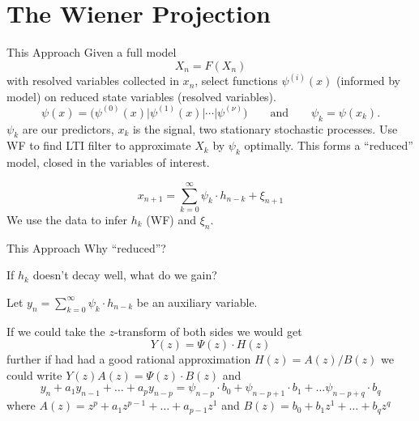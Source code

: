 \documentclass{beamer}  %
\begin{document}



\section{The Wiener Projection}

\begin{frame}{This Approach}
Given a full model
$$X_n = F(X_n)$$
with resolved variables collected in $x_n$,
select functions $\psi^{(i)}(x)$ (informed by model) on reduced state variables (resolved variables).
$$\psi(x) = \Big(\psi^{(0)}(x)\Big|\psi^{(1)}(x)\Big|\cdots\Big|\psi^{(\nu)}\Big)
\qquad\text{and}\qquad\psi_k = \psi(x_k).$$
$\psi_k$ are our predictors, $x_k$ is the signal, two stationary stochastic processes. Use WF to find LTI filter to approximate $X_k$ by $\psi_k$ optimally. This forms a ``reduced'' model, closed in the variables of interest.

\begin{equation*}
\boxed{x_{n+1} =  \sum_{k=0}^\infty \psi_{k}\cdot h_{n-k} + \xi_{n+1}}
\end{equation*}
We use the data to infer $h_{k}$ (WF) and $\xi_{n}$.

\end{frame}

\begin{frame}{This Approach}
	Why ``reduced''?

	If $h_k$ doesn't decay well, what do we gain?
	
	Let $y_n = \sum_{k=0}^\infty \psi_{k}\cdot h_{n-k}$ be an auxiliary variable.
	
	If we could take the $z$-transform of both sides we would get $$Y(z) = \Psi(z)\cdot H(z)$$ further if had had a good rational approximation $H(z) = A(z)/B(z)$ we could write 
	$Y(z)A(z) = \Psi(z)\cdot B(z)$ and 
	$$ y_n+a_1y_{n-1} + \dots +  a_py_{n-p}= \psi_{n-p}\cdot b_0 + \psi_{n-p+1}\cdot b_1 + \dots \psi_{n-p+q}\cdot b_q$$
	where $A(z) = z^p + a_1z^{p-1}+\dots+a_{p-1}z^{1}$ and $B(z) = b_0 + b_1z^{1}+\dots+b_qz^{q}$

\end{frame}

\end{document}
